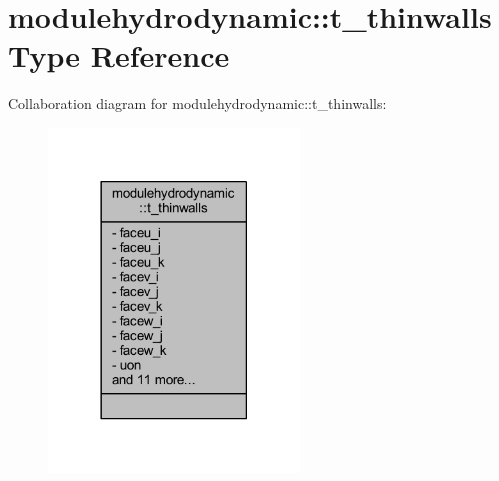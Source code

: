 \hypertarget{structmodulehydrodynamic_1_1t__thinwalls}{}\section{modulehydrodynamic\+:\+:t\+\_\+thinwalls Type Reference}
\label{structmodulehydrodynamic_1_1t__thinwalls}


Collaboration diagram for modulehydrodynamic\+:\+:t\+\_\+thinwalls\+:\nopagebreak
\begin{figure}[H]
\begin{center}
\leavevmode
\includegraphics[width=189pt]{structmodulehydrodynamic_1_1t__thinwalls__coll__graph}
\end{center}
\end{figure}
